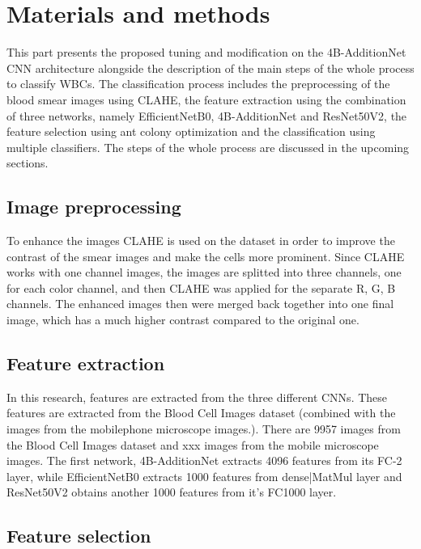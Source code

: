 \section{Materials and methods}\label{methods}

This part presents the proposed tuning and modification on the 4B-AdditionNet
CNN architecture alongside the description of the main steps of the whole process to classify WBCs. The classification process includes the preprocessing of the blood smear images using CLAHE, the feature extraction using the combination of three networks, namely EfficientNetB0, 4B-AdditionNet and ResNet50V2, the feature selection using ant colony optimization and the classification using multiple classifiers. The steps of the whole process are discussed in the upcoming sections.

\subsection{Image preprocessing}

To enhance the images CLAHE
is used on the dataset in order to improve the contrast of the smear images and make the cells more prominent. Since CLAHE works with one channel images, the images are splitted into three channels, one for each color channel, and then CLAHE was applied for the separate R, G, B channels. The enhanced images then were merged back together into one final image, which has a much higher contrast compared to the original one.

\subsection{Feature extraction}
In this research, features are extracted from the three different CNNs. These features are extracted from the Blood Cell Images dataset (combined with the images from the mobilephone microscope images.). There are 9957 images from the Blood Cell Images dataset and xxx images from the mobile microscope images. The first network, 4B-AdditionNet extracts 4096 features from its FC-2 layer, while EfficientNetB0 extracts 1000 features from dense|MatMul layer and ResNet50V2 obtains another 1000 features from it's FC1000 layer.


\subsection{Feature selection}

